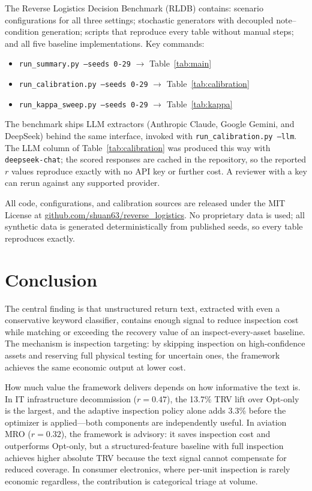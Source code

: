 \documentclass[conference]{IEEEtran}
\begin{document}
The Reverse Logistics Decision Benchmark (RLDB) contains: scenario
configurations for all three settings; stochastic generators with decoupled
note--condition generation; scripts that reproduce every table without manual
steps; and all five baseline implementations. Key commands:

\begin{itemize}[noitemsep]
\item \texttt{run\_summary.py --seeds 0-29} $\rightarrow$ Table~\ref{tab:main}
\item \texttt{run\_calibration.py --seeds 0-29} $\rightarrow$ Table~\ref{tab:calibration}
\item \texttt{run\_kappa\_sweep.py --seeds 0-29} $\rightarrow$ Table~\ref{tab:kappa}
\end{itemize}

The benchmark ships LLM extractors (Anthropic Claude, Google Gemini, and DeepSeek)
behind the same interface, invoked with \texttt{run\_calibration.py --llm}. The
LLM column of Table~\ref{tab:calibration} was produced this way with
\texttt{deepseek-chat}; the scored responses are cached in the repository, so the
reported $r$ values reproduce exactly with no API key or further cost. A reviewer
with a key can rerun against any supported provider.

All code, configurations, and calibration sources are released under the MIT
License at
\href{https://github.com/shuan63/reverse_logistics}{github.com/shuan63/reverse\_logistics}.
No proprietary data is used; all synthetic data is generated deterministically
from published seeds, so every table reproduces exactly.

\section{Conclusion}

The central finding is that unstructured return text, extracted with even a
conservative keyword classifier, contains enough signal to reduce inspection
cost while matching or exceeding the recovery value of an inspect-every-asset
baseline. The mechanism is inspection targeting: by skipping inspection on
high-confidence assets and reserving full physical testing for uncertain ones,
the framework achieves the same economic output at lower cost.

How much value the framework delivers depends on how informative the text is.
In IT infrastructure decommission ($r{=}0.47$), the 13.7\% TRV lift over
Opt-only is the largest, and the adaptive inspection policy alone adds 3.3\%
before the optimizer is applied---both components are independently useful.
In aviation MRO ($r{=}0.32$), the framework is advisory: it saves inspection
cost and outperforms Opt-only, but a structured-feature baseline with full
inspection achieves higher absolute TRV because the text signal cannot compensate
for reduced coverage. In consumer electronics, where per-unit inspection is
rarely economic regardless, the contribution is categorical triage at volume.
\end{document}
